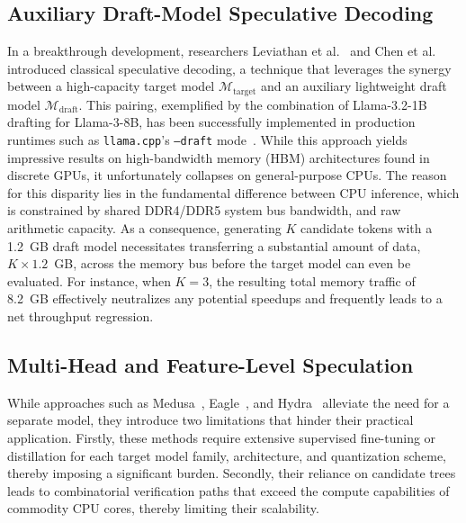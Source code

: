 \documentclass[journal,10pt,twocolumn]{article}
\theoremstyle{definition}
\begin{document}
\subsection{Auxiliary Draft-Model Speculative Decoding}
In a breakthrough development, researchers Leviathan et al.~\cite{leviathan2023} and Chen et al.~\cite{chen2023} introduced classical speculative decoding, a technique that leverages the synergy between a high-capacity target model $\mathcal{M}_{\text{target}}$ and an auxiliary lightweight draft model $\mathcal{M}_{\text{draft}}$. This pairing, exemplified by the combination of Llama-3.2-1B drafting for Llama-3-8B, has been successfully implemented in production runtimes such as \texttt{llama.cpp}'s \texttt{--draft} mode~\cite{llamacpp}. While this approach yields impressive results on high-bandwidth memory (HBM) architectures found in discrete GPUs, it unfortunately collapses on general-purpose CPUs. The reason for this disparity lies in the fundamental difference between CPU inference, which is constrained by shared DDR4/DDR5 system bus bandwidth, and raw arithmetic capacity. As a consequence, generating $K$ candidate tokens with a 1.2~GB draft model necessitates transferring a substantial amount of data, $K \times 1.2$~GB, across the memory bus before the target model can even be evaluated. For instance, when $K=3$, the resulting total memory traffic of 8.2~GB effectively neutralizes any potential speedups and frequently leads to a net throughput regression.

\subsection{Multi-Head and Feature-Level Speculation}
While approaches such as Medusa~\cite{cai2024medusa}, Eagle~\cite{li2024eagle}, and Hydra~\cite{ankner2024hydra} alleviate the need for a separate model, they introduce two limitations that hinder their practical application. Firstly, these methods require extensive supervised fine-tuning or distillation for each target model family, architecture, and quantization scheme, thereby imposing a significant burden. Secondly, their reliance on candidate trees leads to combinatorial verification paths that exceed the compute capabilities of commodity CPU cores, thereby limiting their scalability.
\end{document}
